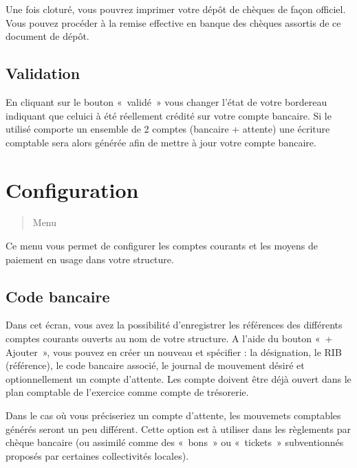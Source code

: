 \documentclass[a4paper,10pt,oneside,french]{sphinxmanual}
\begin{document}
Une fois cloturé, vous pouvrez imprimer votre dépôt de chèques de façon officiel.
Vous pouvez procéder à la remise effective en banque des chèques assortis de ce document de dépôt.


\subsection{Validation}
\label{\detokenize{payoff/deposit:validation}}
En cliquant sur le bouton « validé » vous changer l’état de votre bordereau indiquant que celui\sphinxhyphen{}ci à été réellement crédité sur votre compte bancaire.
Si le  utilisé comporte un ensemble de 2 comptes (bancaire + attente) une écriture comptable sera alors générée afin de mettre à jour votre compte bancaire.


\section{Configuration}
\label{\detokenize{payoff/config:configuration}}\label{\detokenize{payoff/config::doc}}\begin{quote}

Menu 
\end{quote}

Ce menu vous permet de configurer les comptes courants et les moyens de paiement en usage dans votre structure.


\subsection{Code bancaire}
\label{\detokenize{payoff/config:code-bancaire}}
Dans cet écran, vous avez la possibilité d’enregistrer les références des différents comptes courants ouverts au nom de votre structure.
A l’aide du bouton « + Ajouter », vous pouvez en créer un nouveau et spécifier : la désignation, le RIB (référence), le code bancaire associé, le journal de mouvement désiré et optionnellement un compte d’attente.
Les compte doivent être déjà ouvert dans le plan comptable de l’exercice comme compte de trésorerie.

Dans le cas où vous préciseriez un compte d’attente, les mouvemets comptables générés seront un peu différent.
Cette option est à utiliser dans les règlements par chèque bancaire (ou assimilé comme des « bons » ou « tickets » subventionnés proposés par certaines collectivités locales).
\end{document}

